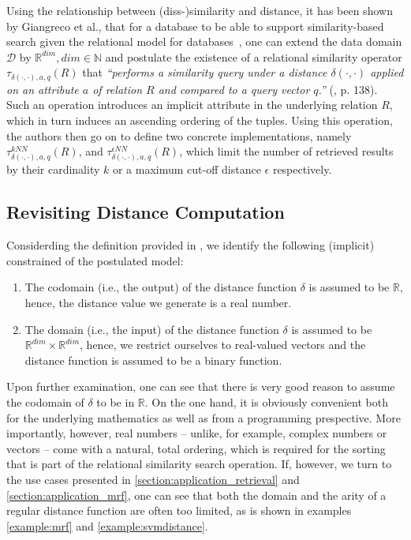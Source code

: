 Using the relationship between (diss-)similarity and distance, it has been shown by Giangreco et al., that for a database to be able to support similarity-based search given the relational model for databases~\cite{Codd:1990Relational}, one can extend the data domain $\mathcal{D}$ by $\mathbb{R}^{dim}, dim \in \mathbb{N}$ and postulate the existence of a relational similarity operator $\tau_{\delta(\cdot,\cdot),a,q}(R)$ that \emph{``performs a similarity query under a distance $\delta(\cdot,\cdot)$ applied on an attribute $a$ of relation $R$ and compared to a query vector $q$.''} (\cite{Giangreco:2018thesis}, p. 138). Such an operation introduces an implicit attribute in the underlying relation $R$, which in turn induces an ascending ordering of the tuples. Using this operation, the authors then go on to define two concrete implementations, namely $\tau^{kNN}_{\delta(\cdot,\cdot),a,q}(R)$, and $\tau^{\epsilon NN}_{\delta(\cdot,\cdot),a,q}(R)$, which limit the number of retrieved results by their cardinality $k$ or a maximum cut-off distance $\epsilon$ respectively.

\subsection{Revisiting Distance Computation}

Considerding the definition provided in , we identify the following (implicit) constrained of the postulated model:

\begin{enumerate}
    \item The codomain (i.e., the output) of the distance function $\delta$ is assumed to be $\mathbb{R}$, hence, the distance value we generate is a real number.
    \item The domain (i.e., the input) of the distance function $\delta$ is assumed to be $\mathbb{R}^{dim} \times \mathbb{R}^{dim}$, hence, we restrict ourselves to real-valued vectors and the distance function is assumed to be a binary function.
\end{enumerate}

Upon further examination, one can see that there is very good reason to assume the codomain of $\delta$ to be in $\mathbb{R}$. On the one hand, it is obviously convenient both for the underlying mathematics as well as from a programming prespective. More importantly, however, real numbers -- unlike, for example, complex numbers or vectors -- come with a natural, total ordering, which is required for the sorting that is part of the relational similarity search operation. If, however, we turn to the use cases presented in \cref{section:application_retrieval} and \cref{section:application_mrf}, one can see that both the domain and the arity of a regular distance function are often too limited, as is shown in examples \cref{example:mrf} and \cref{example:svmdistance}.

